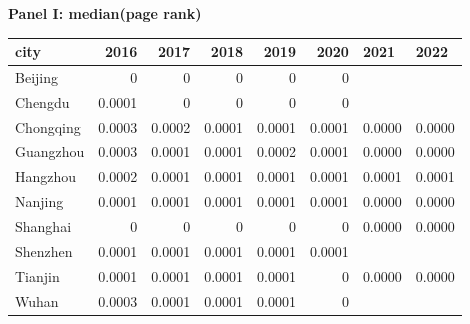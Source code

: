 \textbf{Panel I: median(page rank)}\\
\begin{tabular}{lrrrrrll}
\hline
 city      &   2016 &   2017 &   2018 &   2019 &   2020 & 2021   & 2022   \\
\hline
 Beijing   & 0      & 0      & 0      & 0      & 0      &        &        \\
 Chengdu   & 0.0001 & 0      & 0      & 0      & 0      &        &        \\
 Chongqing & 0.0003 & 0.0002 & 0.0001 & 0.0001 & 0.0001 & 0.0000 & 0.0000 \\
 Guangzhou & 0.0003 & 0.0001 & 0.0001 & 0.0002 & 0.0001 & 0.0000 & 0.0000 \\
 Hangzhou  & 0.0002 & 0.0001 & 0.0001 & 0.0001 & 0.0001 & 0.0001 & 0.0001 \\
 Nanjing   & 0.0001 & 0.0001 & 0.0001 & 0.0001 & 0.0001 & 0.0000 & 0.0000 \\
 Shanghai  & 0      & 0      & 0      & 0      & 0      & 0.0000 & 0.0000 \\
 Shenzhen  & 0.0001 & 0.0001 & 0.0001 & 0.0001 & 0.0001 &        &        \\
 Tianjin   & 0.0001 & 0.0001 & 0.0001 & 0.0001 & 0      & 0.0000 & 0.0000 \\
 Wuhan     & 0.0003 & 0.0001 & 0.0001 & 0.0001 & 0      &        &        \\
\hline
\end{tabular}

